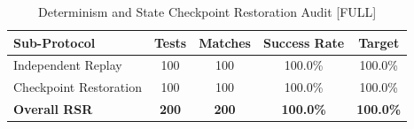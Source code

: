 \begin{table}[ht]
\centering
\caption{Determinism and State Checkpoint Restoration Audit [FULL]}
\begin{tabular}{lcccc}
\hline
Sub-Protocol & Tests & Matches & Success Rate & Target \\
\hline
Independent Replay & 100 & 100 & 100.0\% & 100.0\% \\
Checkpoint Restoration & 100 & 100 & 100.0\% & 100.0\% \\
\textbf{Overall RSR} & \textbf{200} & \textbf{200} & \textbf{100.0\%} & \textbf{100.0\%} \\
\hline
\end{tabular}
\end{table}
